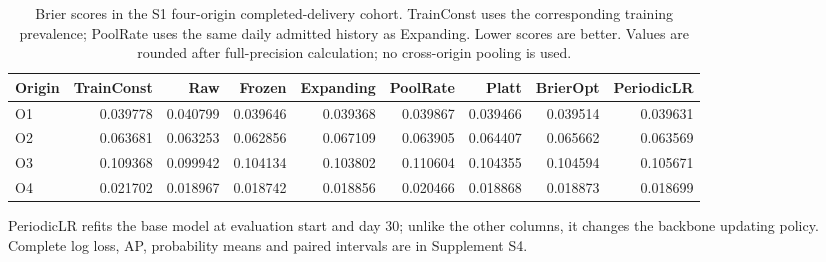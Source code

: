 \begin{table}[!t]
\caption{Brier scores in the S1 four-origin completed-delivery cohort. TrainConst uses the corresponding training prevalence; PoolRate uses the same daily admitted history as Expanding. Lower scores are better. Values are rounded after full-precision calculation; no cross-origin pooling is used.}
\label{tab:main}\centering\footnotesize\setlength{\tabcolsep}{6pt}
\begin{tabular}{lrrrrrrrr}\toprule
Origin & TrainConst & Raw & Frozen & Expanding & PoolRate & Platt & BrierOpt & PeriodicLR\\\midrule
O1 & 0.039778 & 0.040799 & 0.039646 & 0.039368 & 0.039867 & 0.039466 & 0.039514 & 0.039631 \\
O2 & 0.063681 & 0.063253 & 0.062856 & 0.067109 & 0.063905 & 0.064407 & 0.065662 & 0.063569 \\
O3 & 0.109368 & 0.099942 & 0.104134 & 0.103802 & 0.110604 & 0.104355 & 0.104594 & 0.105671 \\
O4 & 0.021702 & 0.018967 & 0.018742 & 0.018856 & 0.020466 & 0.018868 & 0.018873 & 0.018699 \\
\bottomrule\end{tabular}
\begin{flushleft}\footnotesize PeriodicLR refits the base model at evaluation start and day 30; unlike the other columns, it changes the backbone updating policy. Complete log loss, AP, probability means and paired intervals are in Supplement S4.\end{flushleft}
\end{table}
